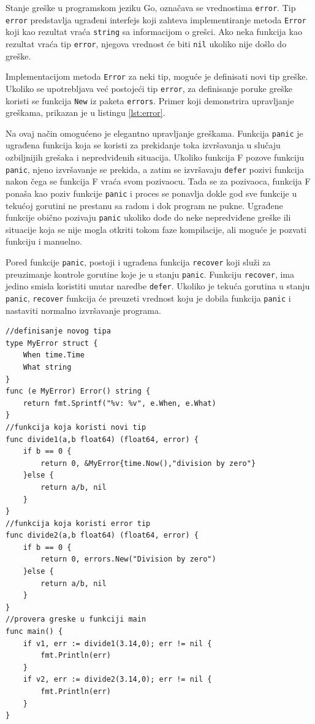 \documentclass[12pt,oneside]{memoir}
\begin{document}
Stanje greške u programskom jeziku Go, označava se vrednostima \texttt{error}. Tip \texttt{error} predstavlja ugrađeni interfejs koji zahteva implementiranje metoda \texttt{Error} koji kao rezultat vraća \texttt{string} sa informacijom o grešci. Ako neka funkcija kao rezultat vraća tip \texttt{error}, njegova vrednost će biti \texttt{nil} ukoliko nije došlo do greške. 

Implementacijom metoda \texttt{Error} za neki tip, moguće je definisati novi tip greške. Ukoliko se upotrebljava već postojeći tip \texttt{error}, za definisanje poruke greške koristi se funkcija \texttt{New} iz paketa \texttt{errors}. Primer koji demonstrira upravljanje greškama, prikazan je u listingu \ref{lst:error}.

Na ovaj način omogućeno je elegantno upravljanje greškama. Funkcija \texttt{panic} je ugrađena funkcija koja se koristi za prekidanje toka izvršavanja u slučaju ozbiljnijih grešaka i nepredviđenih situacija. Ukoliko funkcija F pozove funkciju \texttt{panic}, njeno izvršavanje se prekida, a zatim se izvršavaju \texttt{defer} pozivi funkcija nakon čega se funkcija F vraća svom pozivaocu. Tada se za pozivaoca, funkcija F ponaša kao poziv funkcije \texttt{panic} i proces se ponavlja dokle god sve funkcije u tekućoj gorutini ne prestanu sa radom i dok program ne pukne. Ugrađene funkcije obično pozivaju \texttt{panic} ukoliko dođe do neke nepredviđene greške ili situacije koja se nije mogla otkriti tokom faze kompilacije, ali moguće je pozvati funkciju i manuelno. 

Pored funkcije \texttt{panic}, postoji i ugrađena funkcija \texttt{recover} koji služi za preuzimanje kontrole gorutine koje je u stanju \texttt{panic}. Funkciju \texttt{recover}, ima jedino smisla koristiti unutar naredbe \texttt{defer}. Ukoliko je tekuća gorutina u stanju \texttt{panic}, \texttt{recover} funkcija će preuzeti vrednost koju je dobila funkcija \texttt{panic} i nastaviti normalno izvršavanje programa.

\begin{center}
\begin{lstlisting}[caption=Primer koji demonstrira upravljanje greškama, label={lst:error},  backgroundcolor=\color{background}]
//definisanje novog tipa
type MyError struct {
	When time.Time
	What string
}
func (e MyError) Error() string {
	return fmt.Sprintf("%v: %v", e.When, e.What)
}
//funkcija koja koristi novi tip
func divide1(a,b float64) (float64, error) {
	if b == 0 {
		return 0, &MyError{time.Now(),"division by zero"}
	}else {
		return a/b, nil
	}
}
//funkcija koja koristi error tip
func divide2(a,b float64) (float64, error) {
	if b == 0 {
		return 0, errors.New("Division by zero")
	}else {
		return a/b, nil
	}
}
//provera greske u funkciji main
func main() {
	if v1, err := divide1(3.14,0); err != nil {
		fmt.Println(err)				
	}
	if v2, err := divide2(3.14,0); err != nil {
		fmt.Println(err)			
	}
}
\end{lstlisting}
\end{center}
 
\end{document}

